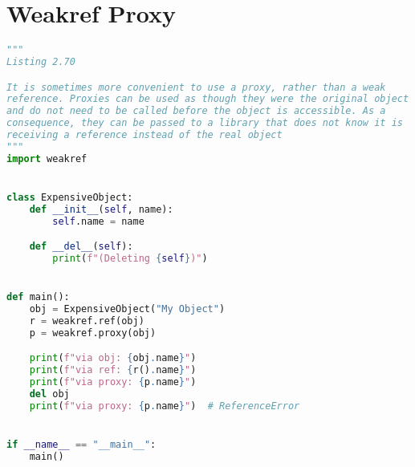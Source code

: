 \documentclass[a4paper,landscape]{report}
\begin{document}
\section{Weakref Proxy}
\begin{lstlisting}[language=Python]
"""
Listing 2.70

It is sometimes more convenient to use a proxy, rather than a weak
reference. Proxies can be used as though they were the original object
and do not need to be called before the object is accessible. As a
consequence, they can be passed to a library that does not know it is
receiving a reference instead of the real object
"""
import weakref


class ExpensiveObject:
    def __init__(self, name):
        self.name = name

    def __del__(self):
        print(f"(Deleting {self})")


def main():
    obj = ExpensiveObject("My Object")
    r = weakref.ref(obj)
    p = weakref.proxy(obj)

    print(f"via obj: {obj.name}")
    print(f"via ref: {r().name}")
    print(f"via proxy: {p.name}")
    del obj
    print(f"via proxy: {p.name}")  # ReferenceError


if __name__ == "__main__":
    main()

\end{lstlisting}
\end{document}
